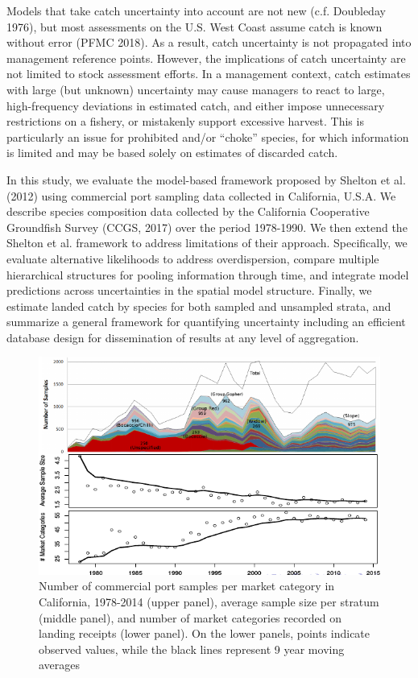 \documentclass[12pt]{article}
\begin{document}
Models that take catch uncertainty into account are not new (c.f.
Doubleday 1976), but most assessments on the U.S. West Coast assume
catch is known without error (PFMC 2018). As a result, catch uncertainty
is not propagated into management reference points. However, the
implications of catch uncertainty are not limited to stock assessment
efforts. In a management context, catch estimates with large (but
unknown) uncertainty may cause managers to react to large,
high-frequency deviations in estimated catch, and either impose
unnecessary restrictions on a fishery, or mistakenly support excessive
harvest. This is particularly an issue for prohibited and/or ``choke''
species, for which information is limited and may be based solely on
estimates of discarded catch.

In this study, we evaluate the model-based framework proposed by Shelton
et al. (2012) using commercial port sampling data collected in
California, U.S.A. We describe species composition data collected by the
California Cooperative Groundfish Survey (CCGS, 2017) over the period
1978-1990. We then extend the Shelton et al. framework to address
limitations of their approach. Specifically, we evaluate alternative
likelihoods to address overdispersion, compare multiple hierarchical
structures for pooling information through time, and integrate model
predictions across uncertainties in the spatial model structure.
Finally, we estimate landed catch by species for both sampled and
unsampled strata, and summarize a general framework for quantifying
uncertainty including an efficient database design for dissemination of
results at any level of aggregation.

\begin{figure}[h!]
\centering
\includegraphics[width=\textwidth]{./pictures/sampleComplex.png}
\caption{Number of commercial port samples per market
category in California, 1978-2014 (upper panel), average sample size per
stratum (middle panel), and number of market categories recorded on
landing receipts (lower panel). On the lower panels, points indicate
observed values, while the black lines represent 9 year moving averages}
\label{sparceData}
\end{figure}
\end{document}
